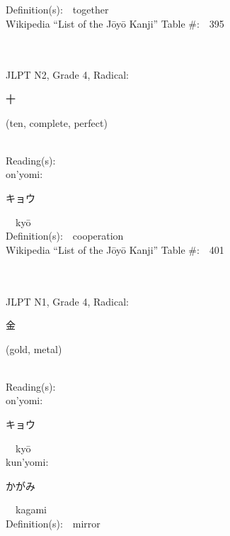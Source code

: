 \begin{multicols}{2}
Definition(s):\ \ together \\
Wikipedia ``List of the J\=oy\=o Kanji'' Table \#:\ \ 395 \\
\ \ \\
{\fontsize{34pt}{40pt}  }\ \ \\  %
{JLPT N2, Grade 4, Radical:\ \ {\begin{CJK}{UTF8}{min} 十 \end{CJK}} (ten, complete, perfect) } \\
Reading(s):\ \ \\
{\hspace*{1em}}on'yomi:\ \ \\
{\hspace*{2em}}{\begin{CJK}{UTF8}{min} キョウ \end{CJK}}\ \ ky\=o\ \ \\
Definition(s):\ \ cooperation \\
Wikipedia ``List of the J\=oy\=o Kanji'' Table \#:\ \ 401 \\
\ \ \\
{\fontsize{34pt}{40pt}  }\ \ \\  %
{JLPT N1, Grade 4, Radical:\ \ {\begin{CJK}{UTF8}{min} 金 \end{CJK}} (gold, metal) } \\
Reading(s):\ \ \\
{\hspace*{1em}}on'yomi:\ \ \\
{\hspace*{2em}}{\begin{CJK}{UTF8}{min} キョウ \end{CJK}}\ \ ky\=o\ \ \\
{\hspace*{1em}}kun'yomi:\ \ \\
{\hspace*{2em}}{\begin{CJK}{UTF8}{min} かがみ \end{CJK}}\ \ kagami\ \ \\
Definition(s):\ \ mirror \\

\end{multicols}
